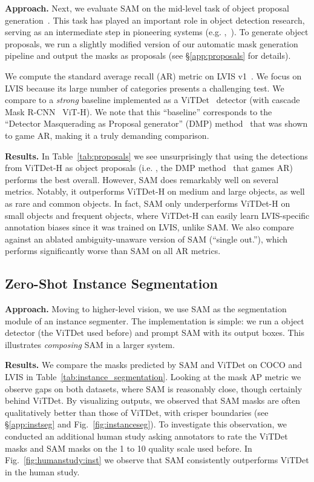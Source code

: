 \textbf{Approach.} Next, we evaluate SAM on the mid-level task of object proposal generation~\cite{alexe2010object,Sande2011}. This task has played an important role in object detection research, serving as an intermediate step in pioneering systems (e.g. ,~\cite{Sande2011,Girshick2014,Ren2015}). To generate object proposals, we run a slightly modified version of our automatic mask generation pipeline and output the masks as proposals (see \S\ref{app:proposals} for details).

We compute the standard average recall (AR) metric on LVIS v1~\cite{Gupta2019}. We focus on LVIS because its large number of categories presents a challenging test. We compare to a \emph{strong} baseline implemented as a ViTDet~\cite{li2022exploring} detector (with cascade Mask R-CNN~\cite{He2017,Cai2018} ViT-H). We note that this ``baseline'' corresponds to the ``Detector Masquerading as Proposal generator'' (DMP) method~\cite{chavali2016object} that was shown to game AR, making it a truly demanding comparison.

\textbf{Results.} In Table~\ref{tab:proposals} we see unsurprisingly that using the detections from ViTDet-H as object proposals (i.e. , the DMP method~\cite{chavali2016object} that games AR) performs the best overall. However, SAM does remarkably well on several metrics. Notably, it outperforms ViTDet-H on medium and large objects, as well as rare and common objects. In fact, SAM only underperforms ViTDet-H on small objects and frequent objects, where ViTDet-H can easily learn LVIS-specific annotation biases since it was trained on LVIS, unlike SAM. We also compare against an ablated ambiguity-unaware version of SAM (``single out.''), which performs significantly worse than SAM on all AR metrics.

\subsection{Zero-Shot Instance Segmentation}\label{sec:eval:instseg}

\textbf{Approach.} Moving to higher-level vision, we use SAM as the segmentation module of an instance segmenter. The implementation is simple: we run a object detector (the ViTDet used before) and prompt SAM with its output boxes. This illustrates \emph{composing} SAM in a larger system.

\textbf{Results.} We compare the masks predicted by SAM and ViTDet on COCO and LVIS in Table~\ref{tab:instance_segmentation}. Looking at the mask AP metric we observe gaps on both datasets, where SAM is reasonably close, though certainly behind ViTDet. By visualizing outputs, we observed that SAM masks are often qualitatively better than those of ViTDet, with crisper boundaries (see \S\ref{app:instseg} and Fig.~\ref{fig:instanceseg}). To investigate this observation, we conducted an additional human study asking annotators to rate the ViTDet masks and SAM masks on the 1 to 10 quality scale used before. In Fig.~\ref{fig:humanstudy:inst} we observe that SAM consistently outperforms ViTDet in the human study.

